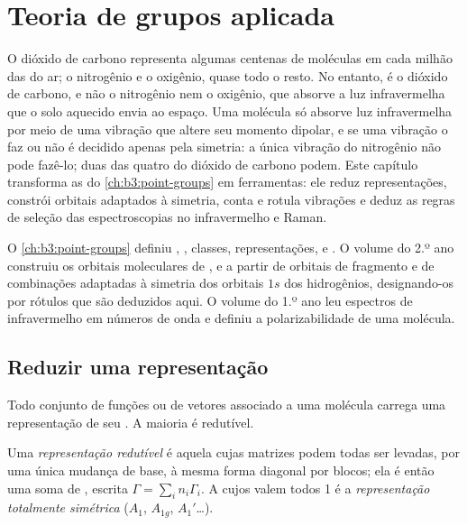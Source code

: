 \chapter{Teoria de grupos aplicada}\label{ch:b3:group-theory-applied}

O dióxido de carbono representa algumas centenas de moléculas em cada milhão
das do ar; o nitrogênio e o oxigênio, quase todo o resto. No entanto, é o
dióxido de carbono, e não o nitrogênio nem o oxigênio, que absorve a luz
infravermelha que o solo aquecido envia ao espaço. Uma molécula só absorve
luz infravermelha por meio de uma vibração que altere seu momento dipolar,
e se uma vibração o faz ou não é decidido apenas pela simetria: a única
vibração do nitrogênio não pode fazê-lo; duas das quatro do dióxido de
carbono podem. Este capítulo transforma as  do
\cref{ch:b3:point-groups} em ferramentas: ele reduz representações, constrói
orbitais adaptados à simetria, conta e rotula vibrações e deduz as regras
de seleção das espectroscopias no infravermelho e Raman.

\begin{recall}
O \cref{ch:b3:point-groups} definiu , ,
classes, representações,  e . O volume do
2.º ano construiu os orbitais moleculares de ,  e  a partir
de orbitais de fragmento e de combinações adaptadas à simetria dos orbitais
$1s$ dos hidrogênios, designando-os por rótulos que são deduzidos aqui. O
volume do 1.º ano leu espectros de infravermelho em números de onda e definiu
a polarizabilidade de uma molécula.
\end{recall}

\section{Reduzir uma representação}

Todo conjunto de funções ou de vetores associado a uma molécula carrega uma
representação de seu . A maioria é redutível.

\begin{definition}\label{def:b3:group-theory-applied:reducible}
Uma \emph{representação redutível} é aquela
cujas matrizes podem todas ser levadas, por uma única mudança de base, à mesma
forma diagonal por blocos; ela é então uma soma de ,
escrita $\Gamma = \sum_in_i\Gamma_i$. A  cujos
 valem todos 1 é a \emph{representação totalmente
simétrica} ($A_1$, $A_{1g}$,
$A_1'$\dots).
\end{definition}

